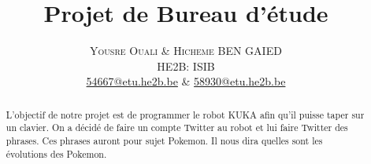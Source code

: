 \documentclass[twoside]{article}
\title{\vspace{-15mm}\fontsize{24pt}{10pt}\selectfont\textbf{Projet de Bureau d'étude}} %
\author{
\large
\textsc{Yousre Ouali \& Hicheme BEN GAIED}\\
\normalsize HE2B: ISIB \\ %
\normalsize \href{mailto:54667@etu.he2b.be}{54667@etu.he2b.be} \& \href{mailto:58930@etu.he2b.be}{58930@etu.he2b.be} %
\vspace{-5mm}
}
\date{}
\begin{document}
\maketitle %

\thispagestyle{fancy} %


\begin{abstract}

\noindent L'objectif de notre projet est de programmer le robot KUKA afin qu'il puisse taper sur un clavier. On a décidé de faire un compte Twitter au robot et lui faire Twitter des phrases. Ces phrases auront pour sujet Pokemon. Il nous dira quelles sont les évolutions des Pokemon.

\end{abstract}
\end{document}
